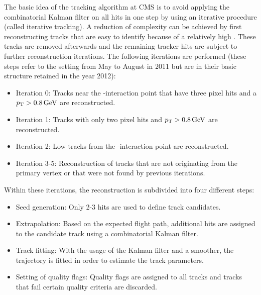 The basic idea of the tracking algorithm at CMS is to avoid applying the combinatorial Kalman filter on all hits in one step by using an iterative procedure (called iterative tracking).
A reduction of complexity can be achieved by first reconstructing tracks that are easy to identify because of \eg a relatively high \pt. 
These tracks are removed afterwards and the remaining tracker hits are subject to further reconstruction iterations.
The following iterations are performed (these steps refer to the setting from May to August in 2011 but are in their basic structure retained in the year 2012):
\begin{itemize}
\item Iteration 0: Tracks near the \pp-interaction point that have three pixel hits and a $p_{\text{T}}>0.8\,\text{Ge}\kern-0.06667em\text{V}$ are reconstructed.
\item Iteration 1: Tracks with only two pixel hits and $p_{\text{T}}>0.8\,\text{Ge}\kern-0.06667em\text{V}$ are reconstructed. 
\item Iteration 2: Low \pt tracks from the \pp-interaction point are reconstructed.
\item Iteration 3-5: Reconstruction of tracks that are not originating from the primary vertex or that were not found by previous iterations.
\end{itemize}
Within these iterations, the reconstruction is subdivided into four different steps:
\begin{itemize}
\item Seed generation: Only 2-3 hits are used to define track candidates.
\item Extrapolation: Based on the expected flight path, additional hits are assigned to the candidate track using a combinatorial Kalman filter.
\item Track fitting: With the usage of the Kalman filter and a smoother, the trajectory is fitted in order to estimate the track parameters.
\item Setting of quality flags: Quality flags are assigned to all tracks and tracks that fail certain quality criteria are discarded.\\
\end{itemize}


